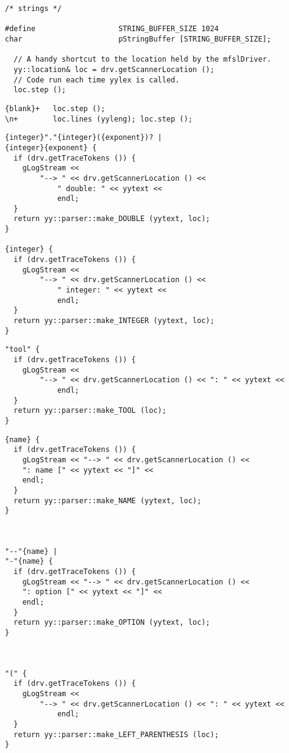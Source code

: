 \begin{lstlisting}[language=Flex]
/* strings */

#define                   STRING_BUFFER_SIZE 1024
char                      pStringBuffer [STRING_BUFFER_SIZE];

  // A handy shortcut to the location held by the mfslDriver.
  yy::location& loc = drv.getScannerLocation ();
  // Code run each time yylex is called.
  loc.step ();
\end{lstlisting}

\begin{lstlisting}[language=Flex]
{blank}+   loc.step ();
\n+        loc.lines (yyleng); loc.step ();
\end{lstlisting}


\begin{lstlisting}[language=Flex]
{integer}"."{integer}({exponent})? |
{integer}{exponent} {
  if (drv.getTraceTokens ()) {
    gLogStream <<
    	"--> " << drv.getScannerLocation () <<
			" double: " << yytext <<
			endl;
  }
  return yy::parser::make_DOUBLE (yytext, loc);
}

{integer} {
  if (drv.getTraceTokens ()) {
    gLogStream <<
    	"--> " << drv.getScannerLocation () <<
			" integer: " << yytext <<
			endl;
  }
  return yy::parser::make_INTEGER (yytext, loc);
}
\end{lstlisting}


\begin{lstlisting}[language=Flex]
"tool" {
  if (drv.getTraceTokens ()) {
    gLogStream <<
    	"--> " << drv.getScannerLocation () << ": " << yytext <<
			endl;
  }
  return yy::parser::make_TOOL (loc);
}
\end{lstlisting}


\begin{lstlisting}[language=Flex]
{name} {
  if (drv.getTraceTokens ()) {
    gLogStream << "--> " << drv.getScannerLocation () <<
    ": name [" << yytext << "]" <<
    endl;
  }
  return yy::parser::make_NAME (yytext, loc);
}



"--"{name} |
"-"{name} {
  if (drv.getTraceTokens ()) {
    gLogStream << "--> " << drv.getScannerLocation () <<
    ": option [" << yytext << "]" <<
    endl;
  }
  return yy::parser::make_OPTION (yytext, loc);
}



"(" {
  if (drv.getTraceTokens ()) {
    gLogStream <<
    	"--> " << drv.getScannerLocation () << ": " << yytext <<
			endl;
  }
  return yy::parser::make_LEFT_PARENTHESIS (loc);
}
\end{lstlisting}


